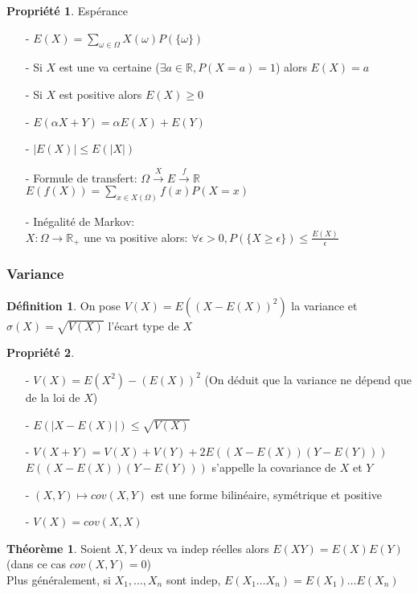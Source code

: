 \documentclass[fleqn]{article}
\theoremstyle{definition} \newtheorem*{defi}{D\'efinition}
\theoremstyle{definition} \newtheorem*{theo}{Th\'eor\`eme}
\theoremstyle{definition} \newtheorem*{coro}{Corollaire}
\theoremstyle{remark} \newtheorem*{rqs}{Remarques}
\theoremstyle{definition} \newtheorem*{prop}{Propri\'et\'e}
\begin{document}
\begin{prop} Esp\'erance
	\begin{itemize}
		\item [-] $E(X) = \sum_{\omega \in \Omega} X(\omega) P(\{\omega\})$
		\item [-] Si $X$ est une va certaine ($\exists a \in \mathbb{R}, P(X=a) = 1$) alors $E(X) = a$
		\item [-] Si $X$ est positive alors $E(X) \geq 0$
		\item [-] $E(\alpha X + Y) = \alpha E(X) + E(Y)$
		\item [-] $|E(X)| \leq E(|X|)$
		\item [-] Formule de transfert: $\Omega \overset{X}{\rightarrow} E \overset{f}{\rightarrow}\mathbb{R}$ \\
			$E(f(X)) = \sum_{x \in X(\Omega)} f(x) P(X=x)$
		\item [-] In\'egalit\'e de Markov:\\
			$X:\Omega \rightarrow \mathbb{R}_+$ une va positive alors: $\forall \epsilon > 0, P(\{X \geq \epsilon\}) \leq \frac{E(X)}{\epsilon}$
	\end{itemize}
\end{prop}

\subsubsection{Variance}
\begin{defi}
	On pose $V(X) = E((X - E(X))^2)$ la variance et $\sigma(X) = \sqrt{V(X)}$ l'\'ecart type de $X$
\end{defi}

\begin{prop} $ $
	\begin{enumerate}
		\item [-] $V(X) = E(X^2) - (E(X))^2$ (On d\'eduit que la variance ne d\'epend que de la loi de $X$)
		\item [-] $E(|X-E(X)|) \leq \sqrt{V(X)}$
		\item [-] $V(X+Y) = V(X) + V(Y) + 2E((X-E(X))(Y-E(Y)))$ \\
			$E((X-E(X))(Y-E(Y)))$ s'appelle la covariance de $X$ et $Y$
		\item [-] $(X,Y) \mapsto cov(X,Y)$ est une forme bilin\'eaire, sym\'etrique et positive
		\item [-] $V(X) = cov(X,X)$
	\end{enumerate}
\end{prop}

\begin{theo}
	Soient $X,Y$ deux va indep r\'eelles alors $E(XY) = E(X)E(Y)$ (dans ce cas $cov(X,Y) = 0$) \\
	Plus g\'en\'eralement, si $X_1, \hdots, X_n$ sont indep, $E(X_1 \hdots X_n) = E(X_1) \hdots E(X_n)$
\end{theo}
\end{document}
